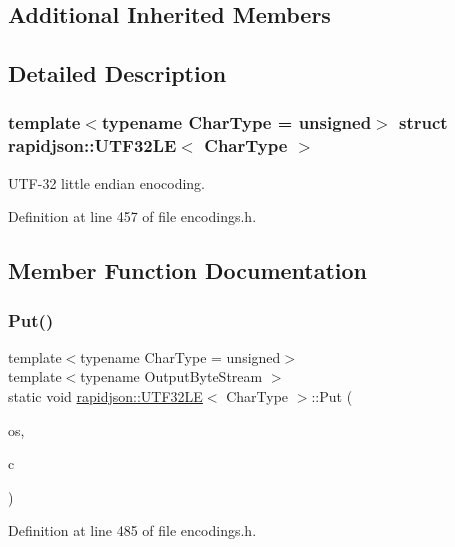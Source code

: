 \subsection*{Additional Inherited Members}


\subsection{Detailed Description}
\subsubsection*{template$<$typename Char\+Type = unsigned$>$\newline
struct rapidjson\+::\+U\+T\+F32\+L\+E$<$ Char\+Type $>$}

U\+T\+F-\/32 little endian enocoding. 

Definition at line 457 of file encodings.\+h.



\subsection{Member Function Documentation}
\mbox{\label{structrapidjson_1_1_u_t_f32_l_e_ae8b1fef6e3bcfe8899f228d7a00ee98c}} 
\subsubsection{\texorpdfstring{Put()}{Put()}}
{\footnotesize\ttfamily template$<$typename Char\+Type  = unsigned$>$ \\
template$<$typename Output\+Byte\+Stream $>$ \\
static void \mbox{\hyperlink{structrapidjson_1_1_u_t_f32_l_e}{rapidjson\+::\+U\+T\+F32\+LE}}$<$ Char\+Type $>$\+::Put (\begin{DoxyParamCaption}\item[{Output\+Byte\+Stream \&}]{os,  }\item[{Char\+Type}]{c }\end{DoxyParamCaption})\hspace{0.3cm}{\ttfamily [static]}}



Definition at line 485 of file encodings.\+h.



